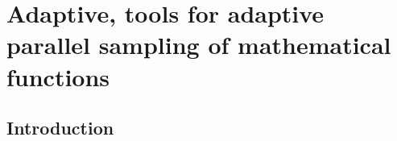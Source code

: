 \chapter{Adaptive, tools for adaptive parallel sampling of mathematical functions}
\label{ch:adaptive}

\newpage
\noindent 
\section{Introduction}



